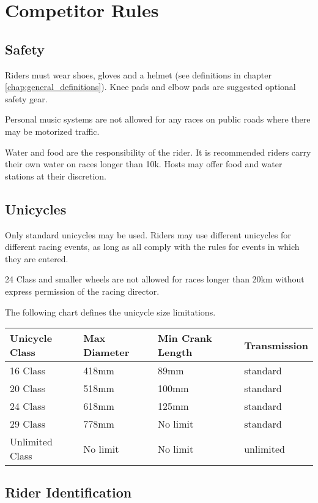 \chapter{Competitor Rules}

\section{Safety}
Riders must wear shoes, gloves and a helmet (see definitions in chapter \ref{chap:general_definitions}).
Knee pads and elbow pads are suggested optional safety gear.

Personal music systems are not allowed for any races on public roads where there may be motorized traffic.

Water and food are the responsibility of the rider.
It is recommended riders carry their own water on races longer than 10k.
Hosts may offer food and water stations at their discretion.

\section{Unicycles}

Only standard unicycles may be used.
Riders may use different unicycles for different racing events, as long as all comply with the rules for events in which they are entered.

24 Class and smaller wheels are not allowed for races longer than 20km without express permission of the racing director.

The following chart defines the unicycle size limitations.
\begin{longtable}{|p{3cm}|p{3cm}|p{4cm}|p{3cm}|}
\hline
\textbf{Unicycle Class} & \textbf{Max Diameter} & \textbf{Min Crank Length} & \textbf{Transmission}\\
\hline
16 Class & 418mm & 89mm & standard \\
\hline
20 Class & 518mm & 100mm & standard \\
\hline
24 Class & 618mm & 125mm & standard \\
\hline
29 Class & 778mm & No limit & standard \\
\hline
Unlimited Class & No limit & No limit & unlimited \\
\hline
\end{longtable}

\section{Rider Identification}


